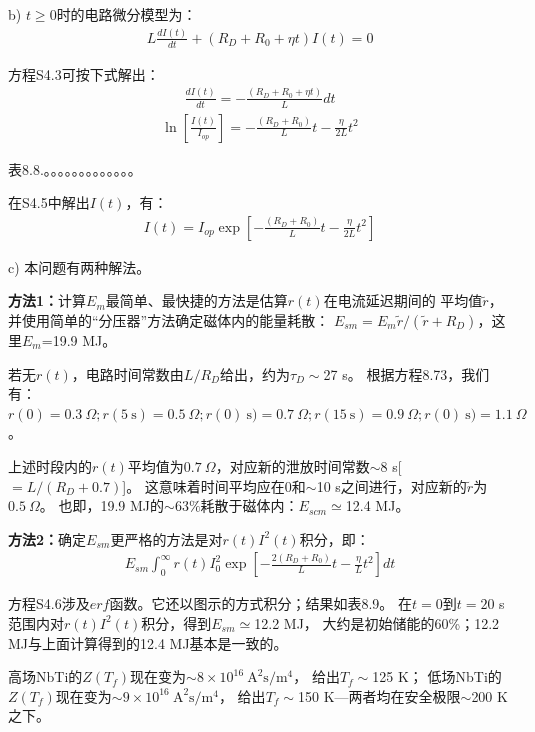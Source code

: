 b) $t\ge 0$时的电路微分模型为：
\begin{align*}%
L\frac{dI(t)}{dt}+(R_D+R_0+\eta t)I(t)=0
\end{align*}

方程S4.3可按下式解出：
\begin{align*}%
\frac{dI(t)}{dt}=-\frac{(R_D+R_0+\eta t)}{L}dt \tag{S4.4}
\end{align*}
\begin{align*}%
\ln\left[\frac{I(t)}{I_{op}}\right]=-\frac{(R_D+R_0)}{L}t-\frac{\eta}{2L}t^2 \tag{S4.5}
\end{align*}

表8.8.。。。。。。。。。。。。。

在S4.5中解出$I(t)$，有：
\begin{align*}%
I(t)=I_{op}\exp\left[-\frac{(R_D+R_0)}{L}t-\frac{\eta}{2L}t^2\right] \tag{8.74}
\end{align*}

c) 本问题有两种解法。

\textbf{方法1：}\quad 计算$E_m$最简单、最快捷的方法是估算$r(t)$在电流延迟期间的
平均值$\tilde{r}$，并使用简单的“分压器”方法确定磁体内的能量耗散：
$E_{sm}=E_m\tilde{r}/(\tilde{r}+R_D)$，这里$E_m$=19.9 MJ。

若无$r(t)$，电路时间常数由$L/R_D$给出，约为$\tau_D\sim$27 s。
根据方程8.73，我们有：$r(0)=0.3\ \Omega;r(5\ \mathrm{s})=0.5\ \Omega;
r(0)\ \mathrm{s})=0.7\ \Omega;r(15\ \mathrm{s})=0.9\ \Omega;
r(0)\ \mathrm{s})=1.1\ \Omega$。

上述时段内的$r(t)$平均值为$0.7\ \Omega$，对应新的泄放时间常数$\sim8$ s[$=L/(R_D+0.7)$]。
这意味着时间平均应在0和$\sim$10 s之间进行，对应新的$\tilde{r}$为$0.5\ \Omega$。
也即，19.9 MJ的$\sim 63\%$耗散于磁体内：$E_{scm}\simeq$12.4 MJ。

\textbf{方法2：}\quad 确定$E_{sm}$更严格的方法是对$r(t)I^2(t)$积分，即：
\begin{align*}%
E_{sm}\int_{0}^{\infty}r(t)I_{0}^{2}\exp\left[-\frac{2(R_D+R_0)}{L}t-\frac{\eta}{L}t^2\right]dt\tag{S4.6}
\end{align*}

方程S4.6涉及$erf$函数。它还以图示的方式积分；结果如表8.9。
在$t=0$到$t=20$ s范围内对$r(t)I^2(t)$积分，得到$E_{sm}\simeq$12.2 MJ，
大约是初始储能的60\%；12.2 MJ与上面计算得到的12.4 MJ基本是一致的。

高场NbTi的$Z(T_f)$现在变为$\sim 8\times 10^{16}\ \mathrm{A^2 s/m^4}$，
给出$T_f\sim$125 K；
低场NbTi的$Z(T_f)$现在变为$\sim 9\times 10^{16}\ \mathrm{A^2 s/m^4}$，
给出$T_f\sim$150 K---两者均在安全极限$\sim$200 K之下。


